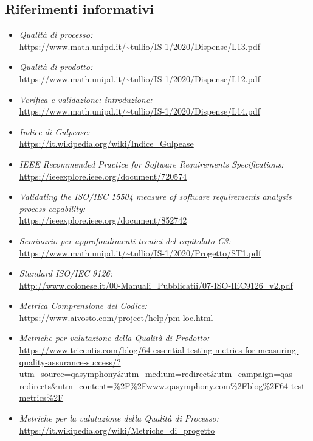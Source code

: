 \subsection{Riferimenti informativi}\label{IntroduzioneRiferimentiRiferimentiInformativi}
\begin{itemize}
	\item \textit{Qualità di processo:}\\
		\url{https://www.math.unipd.it/~tullio/IS-1/2020/Dispense/L13.pdf}
	\item \textit{Qualità di prodotto:}\\
		\url{https://www.math.unipd.it/~tullio/IS-1/2020/Dispense/L12.pdf}
	\item \textit{Verifica e validazione: introduzione:}\\
		\url{https://www.math.unipd.it/~tullio/IS-1/2020/Dispense/L14.pdf}
	\item \textit{Indice di Gulpease:}\\
		\url{https://it.wikipedia.org/wiki/Indice_Gulpease}
	\item \textit{IEEE Recommended Practice for Software Requirements Specifications:}\\
		\url{https://ieeexplore.ieee.org/document/720574}
	\item \textit{Validating the ISO/IEC 15504 measure of software requirements analysis process capability:}\\
		\url{https://ieeexplore.ieee.org/document/852742}
	\item \textit{Seminario per approfondimenti tecnici del capitolato C3:}\\
		\url{https://www.math.unipd.it/~tullio/IS-1/2020/Progetto/ST1.pdf}	
	\item \textit{Standard ISO/IEC 9126:} \\
		\url{http://www.colonese.it/00-Manuali_Pubblicatii/07-ISO-IEC9126_v2.pdf}
	\item \textit{Metrica Comprensione del Codice:} \\
		\url{https://www.aivosto.com/project/help/pm-loc.html}
	\item \textit{Metriche per valutazione della Qualità di Prodotto:} \\
		\url{https://www.tricentis.com/blog/64-essential-testing-metrics-for-measuring-quality-assurance-success/?utm_source=qasymphony&utm_medium=redirect&utm_campaign=qas-redirects&utm_content=%2F%2Fwww.qasymphony.com%2Fblog%2F64-test-metrics%2F}
	\item \textit{Metriche per la valutazione della Qualità di Processo:} \\
		\url{https://it.wikipedia.org/wiki/Metriche_di_progetto}
\end{itemize}
